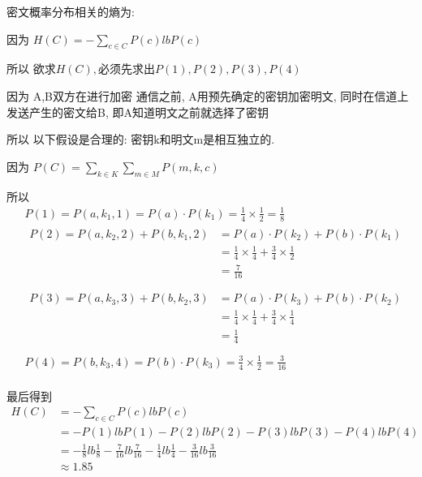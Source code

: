 \documentclass[UTF8]{ctexart}
\begin{document}
密文概率分布相关的熵为:

因为 $H(C)=-\sum\limits_{c\in C}P(c)lbP(c)$

所以 $\mbox{欲求}H(C), \mbox{必须先求出}P(1), P(2), P(3), P(4)$

因为 A,B双方在进行加密 通信之前, A用预先确定的密钥加密明文, 同时在信道上发送产生的密文给B, 即A知道明文之前就选择了密钥

所以 $\mbox{以下假设是合理的: 密钥k和明文m是相互独立的}$.

因为 $P(C)=\sum\limits_{k\in K}\sum\limits_{m\in M}P(m, k, c)$

所以
$$
\begin{aligned}
  &P(1)=P(a,k_1,1)=P(a)\cdot P(k_1)=\frac{1}{4}\times \frac{1}{2}=\frac{1}{8}\\
  &\begin{aligned}
  P(2)=P(a,k_2,2)+P(b,k_1,2)&=P(a)\cdot P(k_2)+P(b)\cdot P(k_1)\\
                            &=\frac{1}{4}\times \frac{1}{4}+\frac{3}{4}\times \frac{1}{2}\\
                            &=\frac{7}{16}\\
  \end{aligned}\\
  &\begin{aligned}
  P(3)=P(a,k_3,3)+P(b,k_2,3)&=P(a)\cdot P(k_3)+P(b)\cdot P(k_2)\\
                            &=\frac{1}{4}\times \frac{1}{4}+\frac{3}{4}\times \frac{1}{4}\\
                            &=\frac{1}{4}\\
  \end{aligned}\\
  &P(4)=P(b,k_3,4)=P(b)\cdot P(k_3)=\frac{3}{4}\times \frac{1}{2}=\frac{3}{16}\\
\end{aligned}
$$

最后得到
$$
\begin{aligned}
  H(C)&=-\sum\limits_{c\in C}P(c)lbP(c)\\
      &=-P(1)lbP(1)-P(2)lbP(2)-P(3)lbP(3)-P(4)lbP(4)\\
      &=-\frac{1}{8}lb\frac{1}{8}-\frac{7}{16}lb\frac{7}{16}-\frac{1}{4}lb\frac{1}{4}-\frac{3}{16}lb\frac{3}{16}\\
      &\approx 1.85
\end{aligned}
$$
\end{document}
